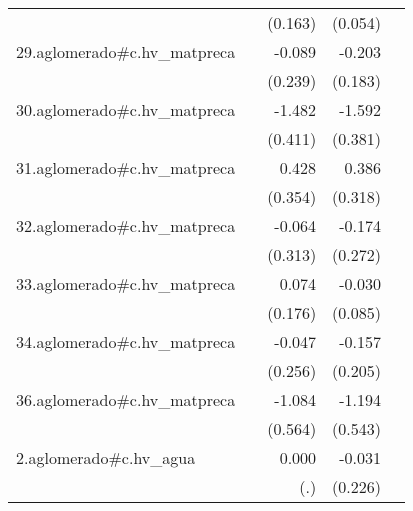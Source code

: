 {\begin{longtable}{l*{4}{D{.}{.}{-1}}}
            &                     &     (0.163)         &     (0.054)         &                     \\
\addlinespace
29.aglomerado#c.hv\_matpreca&                     &      -0.089         &      -0.203         &                     \\
            &                     &     (0.239)         &     (0.183)         &                     \\
\addlinespace
30.aglomerado#c.hv\_matpreca&                     &      -1.482\sym{***}&      -1.592\sym{***}&                     \\
            &                     &     (0.411)         &     (0.381)         &                     \\
\addlinespace
31.aglomerado#c.hv\_matpreca&                     &       0.428         &       0.386         &                     \\
            &                     &     (0.354)         &     (0.318)         &                     \\
\addlinespace
32.aglomerado#c.hv\_matpreca&                     &      -0.064         &      -0.174         &                     \\
            &                     &     (0.313)         &     (0.272)         &                     \\
\addlinespace
33.aglomerado#c.hv\_matpreca&                     &       0.074         &      -0.030         &                     \\
            &                     &     (0.176)         &     (0.085)         &                     \\
\addlinespace
34.aglomerado#c.hv\_matpreca&                     &      -0.047         &      -0.157         &                     \\
            &                     &     (0.256)         &     (0.205)         &                     \\
\addlinespace
36.aglomerado#c.hv\_matpreca&                     &      -1.084         &      -1.194\sym{*}  &                     \\
            &                     &     (0.564)         &     (0.543)         &                     \\
\addlinespace
2.aglomerado#c.hv\_agua&                     &       0.000         &      -0.031         &                     \\
            &                     &         (.)         &     (0.226)         &                     \\

\end{longtable}}
